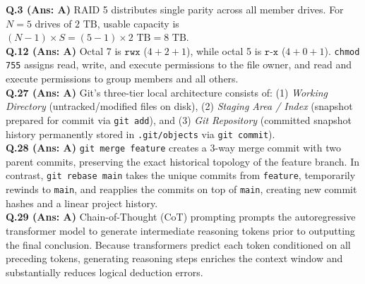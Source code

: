 \begin{solutionbox}
\textbf{Q.3 (Ans: A)} RAID 5 distributes single parity across all member drives. For $N = 5$ drives of $2\text{ TB}$, usable capacity is $(N - 1) \times S = (5 - 1) \times 2\text{ TB} = 8\text{ TB}$.\\[2mm]
\textbf{Q.12 (Ans: A)} Octal 7 is $\texttt{rwx}$ ($4+2+1$), while octal 5 is $\texttt{r-x}$ ($4+0+1$). \texttt{chmod 755} assigns read, write, and execute permissions to the file owner, and read and execute permissions to group members and all others.\\[2mm]
\textbf{Q.27 (Ans: A)} Git's three-tier local architecture consists of: (1) \textit{Working Directory} (untracked/modified files on disk), (2) \textit{Staging Area / Index} (snapshot prepared for commit via \texttt{git add}), and (3) \textit{Git Repository} (committed snapshot history permanently stored in \texttt{.git/objects} via \texttt{git commit}).\\[2mm]
\textbf{Q.28 (Ans: A)} \texttt{git merge feature} creates a 3-way merge commit with two parent commits, preserving the exact historical topology of the feature branch. In contrast, \texttt{git rebase main} takes the unique commits from \texttt{feature}, temporarily rewinds to \texttt{main}, and reapplies the commits on top of \texttt{main}, creating new commit hashes and a linear project history.\\[2mm]
\textbf{Q.29 (Ans: A)} Chain-of-Thought (CoT) prompting prompts the autoregressive transformer model to generate intermediate reasoning tokens prior to outputting the final conclusion. Because transformers predict each token conditioned on all preceding tokens, generating reasoning steps enriches the context window and substantially reduces logical deduction errors.
\end{solutionbox}

\newpage
